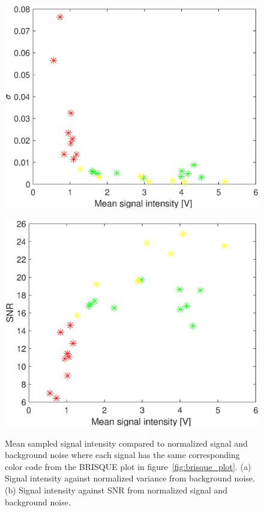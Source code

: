 \begin{figure}[H]
    \centering
\begin{minipage}[t]{0.495\textwidth}
    \includegraphics[width=1\textwidth]{result/noise/meanV_sigma.eps}
    \subcaption{}
    \label{fig:snr_v_sigma}
\end{minipage}
\begin{minipage}[t]{0.495\textwidth}
    \includegraphics[width = \textwidth]{result/noise/meanV_snr.eps}
    \subcaption{}
    \label{fig:snr_v_SNR}
\end{minipage}
    \caption{Mean sampled signal intensity compared to normalized signal and background noise where each signal has the same corresponding color code from the BRISQUE plot in figure~\ref{fig:brisque_plot}.  (a) Signal intensity against normalized variance from background noise. (b) Signal intensity against SNR from normalized signal and background noise.}
    \label{fig:snr}
\end{figure}

